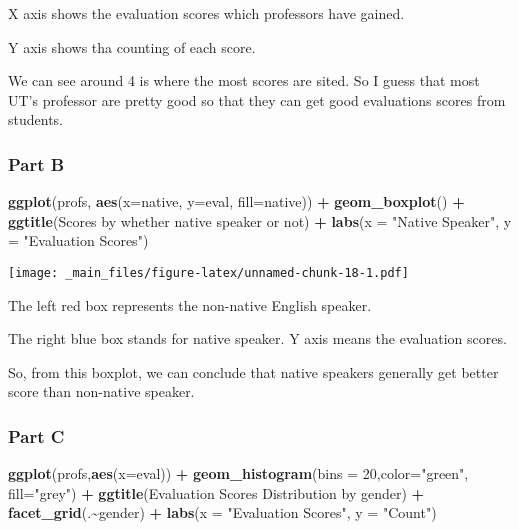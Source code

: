 \documentclass[
]{article}
\newenvironment{Shaded}{\begin{snugshade}}{\end{snugshade}}
\newcommand{\AttributeTok}[1]{\textcolor[rgb]{0.13,0.29,0.53}{#1}}
\newcommand{\DecValTok}[1]{\textcolor[rgb]{0.00,0.00,0.81}{#1}}
\newcommand{\FunctionTok}[1]{\textcolor[rgb]{0.13,0.29,0.53}{\textbf{#1}}}
\newcommand{\NormalTok}[1]{#1}
\newcommand{\SpecialCharTok}[1]{\textcolor[rgb]{0.81,0.36,0.00}{\textbf{#1}}}
\newcommand{\StringTok}[1]{\textcolor[rgb]{0.31,0.60,0.02}{#1}}
\begin{document}
X axis shows the evaluation scores which professors have gained.

Y axis shows tha counting of each score.

We can see around 4 is where the most scores are sited. So I guess that most UT's professor are pretty good so that they can get good evaluations scores from students.

\hypertarget{part-b-2}{%
\subsubsection{Part B}\label{part-b-2}}

\begin{Shaded}
\begin{Highlighting}[]
\FunctionTok{ggplot}\NormalTok{(profs, }\FunctionTok{aes}\NormalTok{(}\AttributeTok{x=}\NormalTok{native, }\AttributeTok{y=}\NormalTok{eval, }\AttributeTok{fill=}\NormalTok{native)) }\SpecialCharTok{+} \FunctionTok{geom\_boxplot}\NormalTok{() }\SpecialCharTok{+} \FunctionTok{ggtitle}\NormalTok{(}\StringTok{\textquotesingle{}Scores by whether native speaker or not\textquotesingle{}}\NormalTok{) }\SpecialCharTok{+} \FunctionTok{labs}\NormalTok{(}\AttributeTok{x =} \StringTok{"Native Speaker"}\NormalTok{, }\AttributeTok{y =} \StringTok{"Evaluation Scores"}\NormalTok{)}
\end{Highlighting}
\end{Shaded}

\texttt{[image: \_main\_files/figure-latex/unnamed-chunk-18-1.pdf]}

The left red box represents the non-native English speaker.

The right blue box stands for native speaker. Y axis means the evaluation scores.

So, from this boxplot, we can conclude that native speakers generally get better score than non-native speaker.

\hypertarget{part-c-1}{%
\subsubsection{Part C}\label{part-c-1}}

\begin{Shaded}
\begin{Highlighting}[]
\FunctionTok{ggplot}\NormalTok{(profs,}\FunctionTok{aes}\NormalTok{(}\AttributeTok{x=}\NormalTok{eval)) }\SpecialCharTok{+} \FunctionTok{geom\_histogram}\NormalTok{(}\AttributeTok{bins =} \DecValTok{20}\NormalTok{,}\AttributeTok{color=}\StringTok{"green"}\NormalTok{, }\AttributeTok{fill=}\StringTok{"grey"}\NormalTok{) }\SpecialCharTok{+} \FunctionTok{ggtitle}\NormalTok{(}\StringTok{\textquotesingle{}Evaluation Scores Distribution by gender\textquotesingle{}}\NormalTok{) }\SpecialCharTok{+} \FunctionTok{facet\_grid}\NormalTok{(.}\SpecialCharTok{\textasciitilde{}}\NormalTok{gender) }\SpecialCharTok{+} \FunctionTok{labs}\NormalTok{(}\AttributeTok{x =} \StringTok{"Evaluation Scores"}\NormalTok{, }\AttributeTok{y =} \StringTok{"Count"}\NormalTok{)}
\end{Highlighting}
\end{Shaded}
\end{document}
